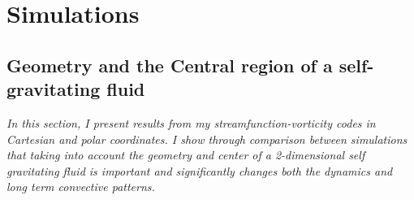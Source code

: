 \documentclass{article}
\begin{document}
\section*{Simulations}


\subsection*{Geometry and the Central region of a self-gravitating fluid}
{\it{In this section, I present results from my streamfunction-vorticity codes in Cartesian and polar coordinates. I show through comparison between simulations that taking into account the geometry and center of a 2-dimensional self gravitating fluid is important and significantly changes both the dynamics and long term convective patterns.}}
\vspace{0.3cm}
\newline
\end{document}
